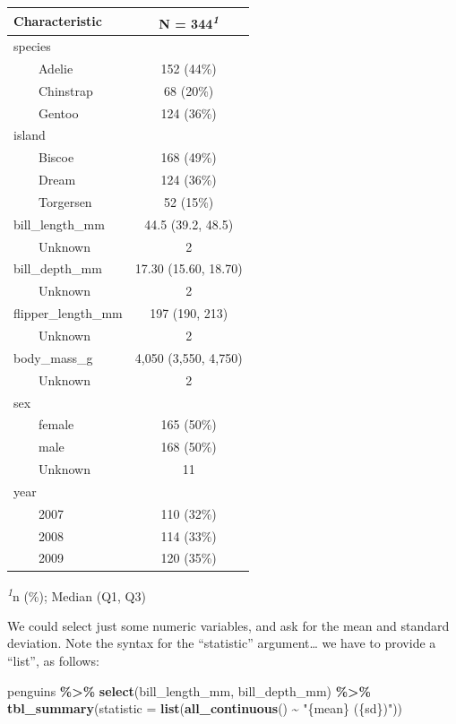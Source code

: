 \documentclass[
]{book}
\newenvironment{Shaded}{\begin{snugshade}}{\end{snugshade}}
\newcommand{\AttributeTok}[1]{\textcolor[rgb]{0.13,0.29,0.53}{#1}}
\newcommand{\FunctionTok}[1]{\textcolor[rgb]{0.13,0.29,0.53}{\textbf{#1}}}
\newcommand{\NormalTok}[1]{#1}
\newcommand{\SpecialCharTok}[1]{\textcolor[rgb]{0.81,0.36,0.00}{\textbf{#1}}}
\newcommand{\StringTok}[1]{\textcolor[rgb]{0.31,0.60,0.02}{#1}}
\begin{document}
\begin{table}[t]
\fontsize{12.0pt}{14.4pt}\selectfont
\begin{tabular*}{\linewidth}{@{\extracolsep{\fill}}lc}
\toprule
\textbf{Characteristic} & \textbf{N = 344}\textsuperscript{\textit{1}} \\ 
\midrule\addlinespace[2.5pt]
species &  \\ 
    Adelie & 152 (44\%) \\ 
    Chinstrap & 68 (20\%) \\ 
    Gentoo & 124 (36\%) \\ 
island &  \\ 
    Biscoe & 168 (49\%) \\ 
    Dream & 124 (36\%) \\ 
    Torgersen & 52 (15\%) \\ 
bill\_length\_mm & 44.5 (39.2, 48.5) \\ 
    Unknown & 2 \\ 
bill\_depth\_mm & 17.30 (15.60, 18.70) \\ 
    Unknown & 2 \\ 
flipper\_length\_mm & 197 (190, 213) \\ 
    Unknown & 2 \\ 
body\_mass\_g & 4,050 (3,550, 4,750) \\ 
    Unknown & 2 \\ 
sex &  \\ 
    female & 165 (50\%) \\ 
    male & 168 (50\%) \\ 
    Unknown & 11 \\ 
year &  \\ 
    2007 & 110 (32\%) \\ 
    2008 & 114 (33\%) \\ 
    2009 & 120 (35\%) \\ 
\bottomrule
\end{tabular*}
\begin{minipage}{\linewidth}
\textsuperscript{\textit{1}}n (\%); Median (Q1, Q3)\\
\end{minipage}
\end{table}

We could select just some numeric variables, and ask for the mean and standard deviation. Note the syntax for the ``statistic'' argument\ldots{} we have to provide a ``list'', as follows:

\begin{Shaded}
\begin{Highlighting}[]
\NormalTok{penguins }\SpecialCharTok{\%\textgreater{}\%}
  \FunctionTok{select}\NormalTok{(bill\_length\_mm, bill\_depth\_mm) }\SpecialCharTok{\%\textgreater{}\%}
  \FunctionTok{tbl\_summary}\NormalTok{(}\AttributeTok{statistic =} \FunctionTok{list}\NormalTok{(}\FunctionTok{all\_continuous}\NormalTok{() }\SpecialCharTok{\textasciitilde{}} \StringTok{"\{mean\} (\{sd\})"}\NormalTok{))}
\end{Highlighting}
\end{Shaded}
\end{document}
